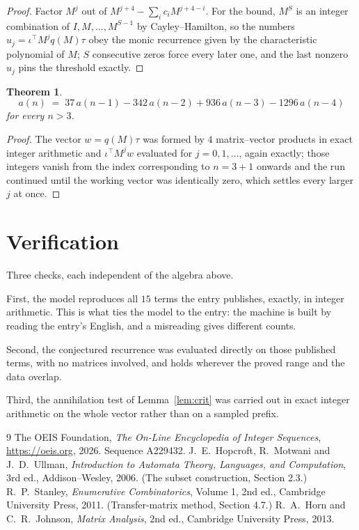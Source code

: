 \documentclass[11pt,a4paper]{article}
\theoremstyle{plain}
\newtheorem{theorem}{Theorem}
\theoremstyle{definition}
\begin{document}
\begin{proof}
Factor $M^{j}$ out of $M^{j+4}-\sum_ic_iM^{j+4-i}$. For the bound, $M^{S}$
is an integer combination of $I,M,\dots,M^{S-1}$ by Cayley--Hamilton, so the numbers
$u_j=\iota^{\!\top}M^{j}q(M)\tau$ obey the monic recurrence given by the characteristic
polynomial of $M$; $S$ consecutive zeros force every later one, and the last nonzero $u_j$
pins the threshold exactly.
\end{proof}

\begin{theorem}
\[
a(n)\;=\;37\,a(n-1) - 342\,a(n-2) + 936\,a(n-3) - 1296\,a(n-4)
\]
for every $n>3$.
\end{theorem}

\begin{proof}
The vector $w=q(M)\tau$ was formed by $4$ matrix--vector products in exact integer
arithmetic and $\iota^{\!\top}M^{j}w$ evaluated for $j=0,1,\dots$, again exactly; those
integers vanish from the index corresponding to $n=3+1$ onwards and the run continued
until the working vector was identically zero, which settles every larger $j$ at once.
\end{proof}

\section{Verification}

Three checks, each independent of the algebra above.

First, the model reproduces all $15$ terms the entry publishes, exactly, in integer
arithmetic. This is what ties the model to the entry: the machine is built by reading the
entry's English, and a misreading gives different counts.

Second, the conjectured recurrence was evaluated directly on those published terms, with no
matrices involved, and holds wherever the proved range and the data overlap.

Third, the annihilation test of Lemma~\ref{lem:crit} was carried out in exact integer
arithmetic on the whole vector rather than on a sampled prefix.

\begin{thebibliography}{9}
 The OEIS Foundation, \emph{The On-Line Encyclopedia of Integer
Sequences}, \url{https://oeis.org}, 2026. Sequence A229432.
 J.~E.~Hopcroft, R.~Motwani and J.~D.~Ullman, \emph{Introduction to Automata
Theory, Languages, and Computation}, 3rd ed., Addison--Wesley, 2006. (The subset
construction, Section 2.3.)
 R.~P.~Stanley, \emph{Enumerative Combinatorics}, Volume 1, 2nd ed.,
Cambridge University Press, 2011. (Transfer-matrix method, Section 4.7.)
 R.~A.~Horn and C.~R.~Johnson, \emph{Matrix Analysis}, 2nd ed., Cambridge
University Press, 2013.
\end{thebibliography}
\end{document}
